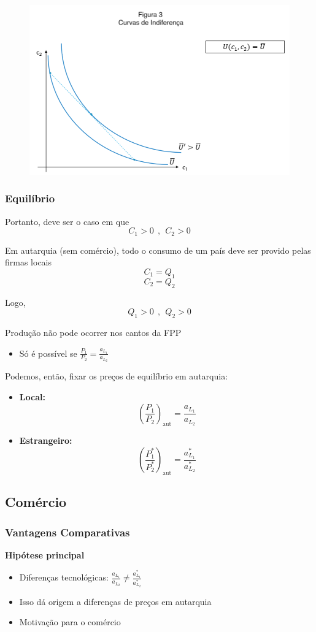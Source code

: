 \documentclass[a4paper,12pt]{article}[abntex2]
\begin{document}
\begin{figure}[H]
    \centering
    \includegraphics[width=0.7\linewidth]{Imagens/a7i3.png}
\end{figure}

\subsubsection{\textbf{Equilíbrio}}
Portanto, deve ser o caso em que
\[
C_1>0 \ \ , \ \ C_2>0 
\]

Em autarquia (sem comércio), todo o consumo de um país deve ser provido pelas firmas locais
\[
C_1=Q_1
\]
\[
C_2=Q_2
\]

Logo, 
\[Q_1>0 \ \ , \ \ Q_2>0 \]

Produção não pode ocorrer nos cantos da FPP\begin{itemize}
    \item Só é possível se \(\frac{P_1}{P_2}=\frac{a_{L_1}}{a_{L_2}}\)
\end{itemize}

Podemos, então, fixar os preços de equilíbrio em autarquia:\begin{itemize}
    \item \textbf{Local:}
    \[
    \left( \frac{P_1}{P_2} \right)_{\text{aut}} = \frac{a_{L_1}}{a_{L_2}}
    \]

    \item \textbf{Estrangeiro:}
    \[
    \left( \frac{P_1^*}{P_2^*} \right)_{\text{aut}} = \frac{a_{L_1}^*}{a_{L_2}^*}
    \]
\end{itemize}

\subsection{\textbf{Comércio}}
\subsubsection{\textbf{Vantagens Comparativas}}
\textbf{Hipótese principal}\begin{itemize}
    \item Diferenças tecnológicas: \( \frac{a_{L_1}}{a_{L_2}} \neq \frac{a^*_{L_1}}{a^*_{L_2}} \)
    \item Isso dá origem a diferenças de preços em autarquia
    \item Motivação para o comércio
\end{itemize}
\end{document}
